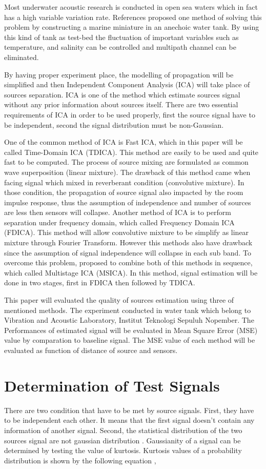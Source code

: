 \documentclass[a4paper]{jpconf}
\begin{document}
Most underwater acoustic research is conducted in open sea waters which in fact has a high variable variation rate. References \cite{1} proposed one method of solving this problem by constructing a marine miniature in an anechoic water tank. By using this kind of tank as test-bed the fluctuation of important variables such as temperature, and salinity can be controlled and multipath channel can be eliminated. 

By having proper experiment place, the modelling of propagation will be simplified and then Independent Component Analysis (ICA) will take place of sources separation. ICA is one of the method which estimate sources signal without any prior information about sources itself. There are two essential requirements of ICA in order to be used properly, first the source signal have to be independent, second the signal distribution must be non-Gaussian.

One of the common method of ICA is Fast ICA, which in this paper will be called Time-Domain ICA (TDICA). This method are easily to be used and quite fast to be computed. The process of source mixing are formulated as common wave superposition (linear mixture). The drawback of this method came when facing signal which mixed in reverberant condition (convolutive mixture). In those condition, the propagation of source signal also impacted by the room impulse response, thus the assumption of independence and number of sources are less then sensors will collapse. Another method of ICA is to perform separation under frequency domain, which called Frequency Domain ICA (FDICA). This method will allow convolutive mixture to be simplify as linear mixture through Fourier Transform. However this methods also have drawback since the assumption of signal independence will collapse in each sub band. To overcome this problem, \cite{2} proposed to combine both of this methods in sequence, which called Multistage ICA (MSICA). In this method, signal estimation will be done in two stages, first in FDICA then followed by TDICA. 

This paper will evaluated the quality of sources estimation using three of mentioned methods. The experiment conducted in water tank which belong to Vibration and Acoustic Laboratory, Institut Teknologi Sepuluh Nopember. The Performances of estimated signal will be evaluated in Mean Square Error (MSE) value by comparation to baseline signal. The MSE value of each method will be evaluated as function of distance of source and sensors.

\section{Determination of Test Signals}
There are two condition that have to be met by source signals. First, they have to be independent each other. It means that the first signal doesn’t contain any information of another signal. Second, the statistical distribution of the two sources signal are not gaussian distribution \cite{3}. Gaussianity of a signal can be determined by testing the value of kurtosis. Kurtosis values ​​of a probability distribution is shown by the following equation \cite{4},
\end{document}
